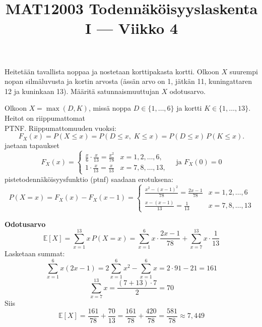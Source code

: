 \documentclass[12pt,a4paper]{article}
\title{MAT12003 Todennäköisyyslaskenta I — Viikko 4}
\date{}
\begin{document}
\maketitle

Heitetään tavallista noppaa ja nostetaan korttipakasta kortti. Olkoon $X$ suurempi nopan silmäluvusta ja kortin arvosta (ässän arvo on 1, jätkän 11, kuningattaren 12 ja kuninkaan 13). Määritä satunnaismuuttujan $X$ odotusarvo.

\vspace{0.4cm}
Olkoon $X=\max(D,K)$, missä
noppa $D\in\{1,\dots,6\}$ ja kortti $K\in\{1,\dots,13\}$.
Heitot on riippumattomat\\


PTNF. Riippumattomuuden vuoksi:
\[
F_X(x)=P(X\le x)=P(D\le x,\;K\le x)=P(D\le x)\,P(K\le x).
\]
jaetaan tapaukset
\[
F_X(x)=
\begin{cases}
\displaystyle \frac{x}{6}\cdot\frac{x}{13}=\frac{x^2}{78} & x=1,2,\dots,6,\\[6pt]
\displaystyle 1\cdot\frac{x}{13}=\frac{x}{13} & x=7,8,\dots,13,
\end{cases}
\quad\text{ja }F_X(0)=0
\]
pistetodennäköisyysfunktio (ptnf) saadaan erotuksena:
\[
P(X=x)=F_X(x)-F_X(x-1)=
\begin{cases}
\displaystyle \frac{x^2-(x-1)^2}{78}=\frac{2x-1}{78} & x=1,2,\dots,6\\[8pt]
\displaystyle \frac{x-(x-1)}{13}=\frac{1}{13} & x=7,8,\dots,13
\end{cases}
\]

\textbf{Odotusarvo} 
\[
\mathbb{E}[X]=\sum_{x=1}^{13} x\,P(X=x)
=\sum_{x=1}^{6} x\cdot\frac{2x-1}{78}+\sum_{x=7}^{13} x\cdot\frac{1}{13}
\]
Lasketaan summat:
\[
\sum_{x=1}^{6} x(2x-1)=2\sum_{x=1}^{6}x^2-\sum_{x=1}^{6}x
=2\cdot 91-21=161
\]
\[
\sum_{x=7}^{13} x = \frac{(7+13)\cdot 7}{2}=70
\]
Siis
\[
\mathbb{E}[X]=\frac{161}{78}+\frac{70}{13}
=\frac{161}{78}+\frac{420}{78}
=\frac{581}{78}\approx 7{,}449
\]

\end{document}
